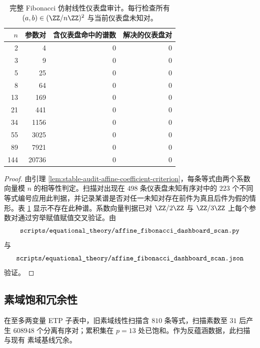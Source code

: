 \documentclass[../../main.tex]{subfiles}
\begin{document}
\begin{table}[H]
\centering
\scriptsize
\setlength{\tabcolsep}{8pt}
\caption{完整 Fibonacci 仿射线性仪表盘审计。每行检查所有 \((a,b)\in(\ZZ/n\ZZ)^2\) 与当前仪表盘未知对。}
\label{tab:stable-audit-affine-fibonacci-dashboard}
\begin{tabular}{r r r r}
\toprule
\(n\) & 参数对 & 含仪表盘命中的谱数 & 解决的仪表盘对\\
\midrule
2   & 4     & 0 & 0\\
3   & 9     & 0 & 0\\
5   & 25    & 0 & 0\\
8   & 64    & 0 & 0\\
13  & 169   & 0 & 0\\
21  & 441   & 0 & 0\\
34  & 1156  & 0 & 0\\
55  & 3025  & 0 & 0\\
89  & 7921  & 0 & 0\\
144 & 20736 & 0 & 0\\
\bottomrule
\end{tabular}
\end{table}

\begin{proof}
由引理 \ref{lem:stable-audit-affine-coefficient-criterion}，每条等式由两个系数向量模 \(n\) 的相等性判定。扫描对出现在 \(498\) 条仪表盘未知有序对中的 \(223\) 个不同等式编号应用此判据，并记录某谱是否对任一未知对存在前件为真且后件为假的情形。表 \ref{tab:stable-audit-affine-fibonacci-dashboard} 显示不存在此种谱。系数向量判据已对 \(\ZZ/2\ZZ\) 与 \(\ZZ/3\ZZ\) 上每个参数对通过穷举赋值赋值交叉验证。由
\[
    \texttt{\detokenize{scripts/equational_theory/affine_fibonacci_dashboard_scan.py}}
\]
与
\[
    \texttt{\detokenize{scripts/equational_theory/affine_fibonacci_dashboard_scan.json}}
\]
验证。
\end{proof}

\subsection{素域饱和冗余性}

\begin{proposition}[旧素域线性审计的冗余性]\label{prop:stable-audit-prime-field-redundancy}
在至多两变量 ETP 子表中，旧素域线性扫描含 \(810\) 条等式，扫描素数至 \(31\) 后产生 \(608948\) 个分离有序对；累积集在 \(p=13\) 处已饱和。作为反蕴涵数据，此扫描与现有 \texttt{} 素域基线冗余。
\end{proposition}
\end{document}
